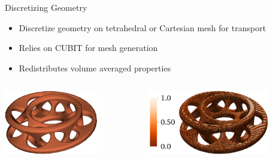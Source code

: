 \documentclass[xcolor=x11names,compress]{beamer}
\begin{document}
\begin{frame}{Discretizing Geometry}
    \begin{itemize}
        \item Discretize geometry on tetrahedral or Cartesian mesh for transport
        \item Relies on CUBIT for mesh generation
        \item Redistributes volume averaged properties
    \end{itemize}
    \begin{columns}
        \begin{column}{0.45\textwidth}
            \includegraphics[height=1.1in,clip]{mobius_cad.png}
  	    \end{column}
 	    \begin{column}{0.45\textwidth}
            \includegraphics[height=1.1in,clip]{mobius_mesh.png}
        \end{column}
    \end{columns}
\end{frame}
\end{document}
